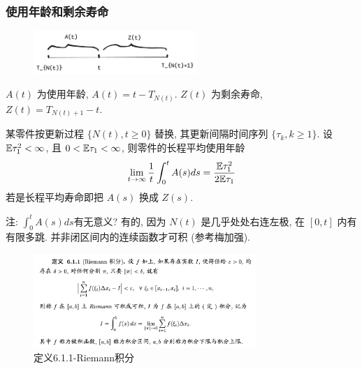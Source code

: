 \subsubsection{使用年龄和剩余寿命}

\begin{figure}[H]
    \centering
    \includegraphics[width=0.55\textwidth]{figures/p119.png}
\end{figure}

$A(t)$ 为使用年龄, $A(t)=t-T_{N(t)}$. $Z(t)$ 为剩余寿命, $Z(t)=T_{N(t)+1}-t$.

\begin{example}
    某零件按更新过程 $\{N(t),t\geq 0\}$ 替换, 其更新间隔时间序列 $\{\tau_k,k\geq 1\}$. 设 $\mathbb E \tau_1^2<\infty$, 且 $0<\mathbb E\tau_1<\infty$, 则零件的长程平均使用年龄
    \[
    \lim_{t \to \infty}\frac{1}{t}\int_0^tA(s)ds=\frac{\mathbb E\tau_1^2}{2\mathbb E\tau_1}
    \]
    若是长程平均寿命即把 $A(s)$ 换成 $Z(s)$.
\end{example}
注: $\int_0^tA(s)ds$有无意义? 有的, 因为 $N(t)$ 是几乎处处右连左极, 在 $[0,t]$ 内有有限多跳. 并非闭区间内的连续函数才可积 (参考梅加强\cite{jiaqiang}).
\begin{figure}[H]
\centering
\includegraphics[width=0.75\textwidth]{figures/Riemann-integral.png}
\caption{定义6.1.1-Riemann积分}
\end{figure}

